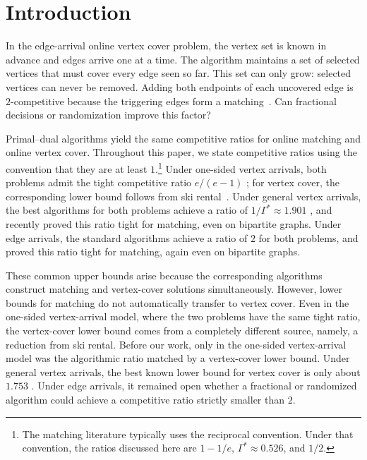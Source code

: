 \section{Introduction}
\label{sec:introduction}

In the edge-arrival online vertex cover problem, the vertex set is known in
advance and edges arrive one at a time.  The algorithm maintains a set of
selected vertices that must cover every edge seen so far.  This set can only
grow: selected vertices can never be removed.  
Adding both endpoints of each
uncovered edge is $2$-competitive because the triggering edges form a matching~\citep{DemangePaschos05}.
Can fractional decisions or randomization improve this factor?

Primal--dual algorithms yield the same competitive ratios for online matching and online vertex cover. Throughout this paper, we state competitive ratios using the convention that they are at least $1$.\footnote{The matching literature typically uses the reciprocal convention. Under that convention, the ratios discussed here are $1-1/e$, $\Gamma^*\approx 0.526$, and $1/2$.}
Under one-sided vertex arrivals, both problems admit the tight competitive ratio $e/(e-1)$ \citep{KVV90}; for vertex cover, the corresponding lower bound follows from ski rental~\citep{WangWong15}. Under general vertex arrivals, the best algorithms for both problems achieve a ratio of $1/\Gamma^*\approx 1.901$ \citep{WangWong15,TangZhang24}, and \citet{Tang26} recently proved this ratio tight for matching, even on bipartite graphs. Under edge arrivals, the standard algorithms achieve a ratio of $2$ for both problems, and \citet{GamlathEtAl19} proved this ratio tight for matching, again even on bipartite graphs.

These common upper bounds arise because the corresponding algorithms construct matching and vertex-cover solutions simultaneously. However, lower bounds for matching do not automatically transfer to vertex cover. Even in the one-sided vertex-arrival model, where the two problems have the same tight ratio, the vertex-cover lower bound comes from a completely different source, namely, a reduction from ski rental. Before our work, only in the one-sided vertex-arrival model was the algorithmic ratio matched by a vertex-cover lower bound. Under general vertex arrivals, the best known lower bound for vertex cover is only about $1.753$ \citep{WangWong15}. Under edge arrivals, it remained open whether a fractional or randomized algorithm could achieve a competitive ratio strictly smaller than $2$.

